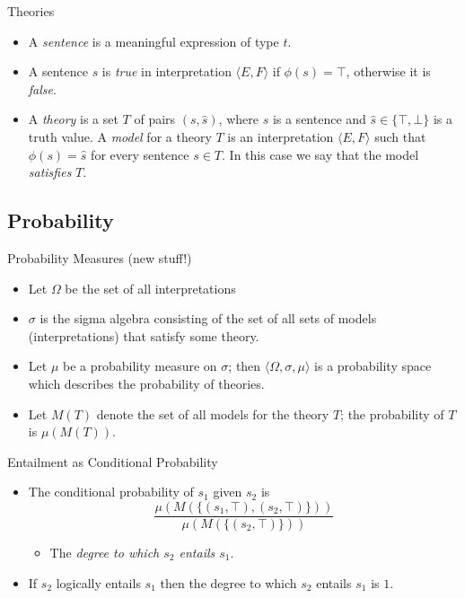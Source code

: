 \documentclass{beamer}
\newlength{\wideitemsep}
\let\olditem\item
\renewcommand{\item}{\setlength{\itemsep}{\wideitemsep}\olditem}
\begin{document}
\begin{frame}{Theories}
  \begin{itemize}
  \item A \emph{sentence} is a meaningful expression of type $t$.
  \item A sentence $s$ is \emph{true} in interpretation $\langle E,
    F\rangle$ if $\phi(s) = \top$, otherwise it is \emph{false}.
  \item A \emph{theory} is a set $T$ of pairs $(s,\hat{s})$, where $s$
    is a sentence and $\hat{s}\in\{\top,\bot\}$ is a truth value. A
    \emph{model} for a theory $T$ is an interpretation $\langle E,
    F\rangle$ such that $\phi(s) = \hat{s}$ for every sentence $s\in
    T$. In this case we say that the model \emph{satisfies} $T$.
  \end{itemize}
\end{frame}

\subsection{Probability}

\begin{frame}{Probability Measures (new stuff!)}
  \begin{itemize}
  \item Let $\Omega$ be the set of all interpretations
  \item $\sigma$ is the sigma algebra consisting of the set of all
    sets of models (interpretations) that satisfy some theory.
  \item Let $\mu$ be a probability measure on $\sigma$; then
    $\langle\Omega,\sigma,\mu\rangle$ is a probability space which
    describes the probability of theories.
  \item Let $M(T)$ denote the set of all models for the theory $T$;
    the probability of $T$ is $\mu(M(T))$.
  \end{itemize}
\end{frame}

\begin{frame}{Entailment as Conditional Probability}
  \begin{itemize}
  \item The conditional probability of $s_1$ given $s_2$ is
    $$\frac{\mu(M(\{(s_1, \top), (s_2, \top)\}))}{\mu(M(\{(s_2,\top)\}))}$$
    \begin{itemize}
    \item The {\em degree to which $s_2$ entails $s_1$\/}. 
    \end{itemize}
  \item If $s_2$ logically entails $s_1$ then the degree to which  $s_2$ entails $s_1$ is $1$.
\end{itemize}
\end{frame}
\end{document}
